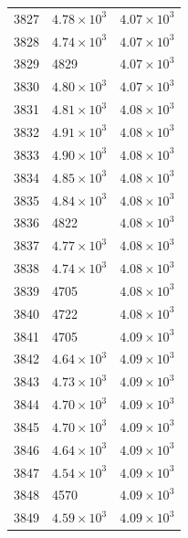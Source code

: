 \begin{table}[H]
\begin{tabular}{lll}
3827 & $\displaystyle 4.78 \times 10^{3}$ & $\displaystyle 4.07 \times 10^{3}$ \\
3828 & $\displaystyle 4.74 \times 10^{3}$ & $\displaystyle 4.07 \times 10^{3}$ \\
3829 & 4829 & $\displaystyle 4.07 \times 10^{3}$ \\
3830 & $\displaystyle 4.80 \times 10^{3}$ & $\displaystyle 4.07 \times 10^{3}$ \\
3831 & $\displaystyle 4.81 \times 10^{3}$ & $\displaystyle 4.08 \times 10^{3}$ \\
3832 & $\displaystyle 4.91 \times 10^{3}$ & $\displaystyle 4.08 \times 10^{3}$ \\
3833 & $\displaystyle 4.90 \times 10^{3}$ & $\displaystyle 4.08 \times 10^{3}$ \\
3834 & $\displaystyle 4.85 \times 10^{3}$ & $\displaystyle 4.08 \times 10^{3}$ \\
3835 & $\displaystyle 4.84 \times 10^{3}$ & $\displaystyle 4.08 \times 10^{3}$ \\
3836 & 4822 & $\displaystyle 4.08 \times 10^{3}$ \\
3837 & $\displaystyle 4.77 \times 10^{3}$ & $\displaystyle 4.08 \times 10^{3}$ \\
3838 & $\displaystyle 4.74 \times 10^{3}$ & $\displaystyle 4.08 \times 10^{3}$ \\
3839 & 4705 & $\displaystyle 4.08 \times 10^{3}$ \\
3840 & 4722 & $\displaystyle 4.08 \times 10^{3}$ \\
3841 & 4705 & $\displaystyle 4.09 \times 10^{3}$ \\
3842 & $\displaystyle 4.64 \times 10^{3}$ & $\displaystyle 4.09 \times 10^{3}$ \\
3843 & $\displaystyle 4.73 \times 10^{3}$ & $\displaystyle 4.09 \times 10^{3}$ \\
3844 & $\displaystyle 4.70 \times 10^{3}$ & $\displaystyle 4.09 \times 10^{3}$ \\
3845 & $\displaystyle 4.70 \times 10^{3}$ & $\displaystyle 4.09 \times 10^{3}$ \\
3846 & $\displaystyle 4.64 \times 10^{3}$ & $\displaystyle 4.09 \times 10^{3}$ \\
3847 & $\displaystyle 4.54 \times 10^{3}$ & $\displaystyle 4.09 \times 10^{3}$ \\
3848 & 4570 & $\displaystyle 4.09 \times 10^{3}$ \\
3849 & $\displaystyle 4.59 \times 10^{3}$ & $\displaystyle 4.09 \times 10^{3}$ \\

\end{tabular}
\end{table}
